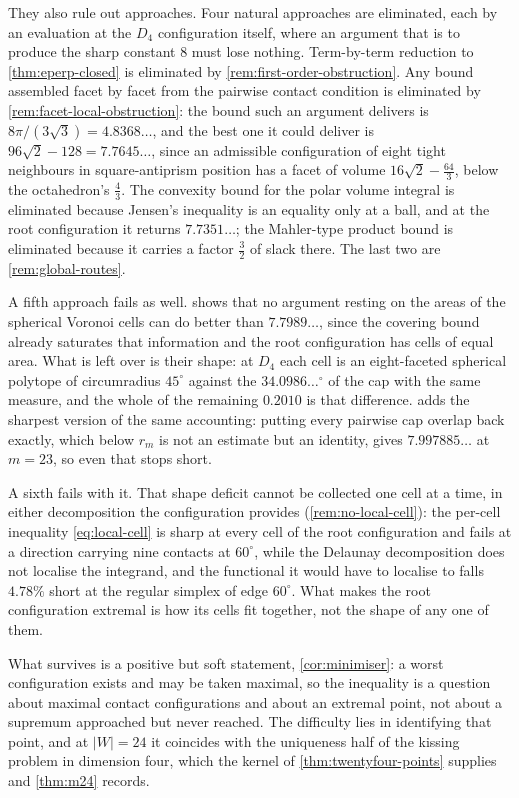 \documentclass[11pt,reqno]{amsart}
\renewcommand{\_}{\origunderscore\allowbreak}
\numberwithin{equation}{section}
\theoremstyle{plain}
\theoremstyle{definition}
\theoremstyle{remark}
\begin{document}
They also rule out approaches. Four natural approaches are
eliminated, each by an evaluation at the $D_4$ configuration itself,
where an argument that is to produce the sharp constant $8$ must lose
nothing. Term-by-term reduction to \cref{thm:eperp-closed} is
eliminated by \cref{rem:first-order-obstruction}. Any bound assembled
facet by facet from the pairwise contact condition is eliminated by
\cref{rem:facet-local-obstruction}: the bound such an argument
delivers is $8\pi/(3\sqrt3)=4.8368\ldots$, and the best one it could
deliver is $96\sqrt2-128=7.7645\ldots$, since an admissible
configuration of eight tight neighbours in square-antiprism position has
a facet of volume $16\sqrt2-\tfrac{64}3$, below the octahedron's
$\tfrac43$. The convexity bound for the polar volume integral is
eliminated because Jensen's inequality is an equality only at a ball,
and at the root configuration it returns $7.7351\ldots$; the Mahler-type
product bound is eliminated because it carries a factor $\tfrac32$ of
slack there. The last two are \cref{rem:global-routes}.

A fifth approach fails as well.  shows
that no argument resting on the areas of the spherical Voronoi cells can
do better than $7.7989\ldots$, since the covering bound already
saturates that information and the root configuration has cells of equal
area. What is left over is their shape: at $D_4$ each cell is an
eight-faceted spherical polytope of circumradius $45^\circ$ against the
$34.0986\ldots^\circ$ of the cap with the same measure, and the whole of
the remaining $0.2010$ is that difference.  adds
the sharpest version of the same accounting: putting every pairwise cap
overlap back exactly, which below $r_m$ is not an estimate but an
identity, gives $7.997885\ldots$ at $m=23$, so even that stops short.

A sixth fails with it. That shape deficit cannot be collected one cell at
a time, in either decomposition the configuration provides
(\cref{rem:no-local-cell}): the per-cell inequality \eqref{eq:local-cell}
is sharp at every cell of the root configuration and fails at a
direction carrying nine contacts at $60^\circ$, while the Delaunay
decomposition does not localise the integrand, and the functional
it would have to localise to falls $4.78\%$ short at the regular simplex
of edge $60^\circ$. What makes the root configuration extremal is how
its cells fit together, not the shape of any one of them.

What survives is a positive but soft statement,
\cref{cor:minimiser}: a worst configuration exists and may be taken
maximal, so the inequality is a question about maximal contact
configurations and about an extremal point, not about a
supremum approached but never reached. The difficulty lies in identifying
that point, and at $|W|=24$ it coincides with the uniqueness
half of the kissing problem in dimension four, which the kernel of
\cref{thm:twentyfour-points} supplies and \cref{thm:m24} records.
\end{document}
